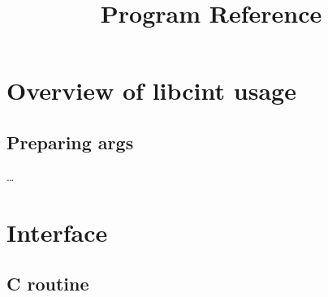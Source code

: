 \documentclass{article}
\title{Program Reference}
\begin{document}
\maketitle

\tableofcontents

\section{Overview of libcint usage}

\subsection{Preparing args}

\ldots{}

\section{Interface}

\subsection{C routine}
\end{document}
